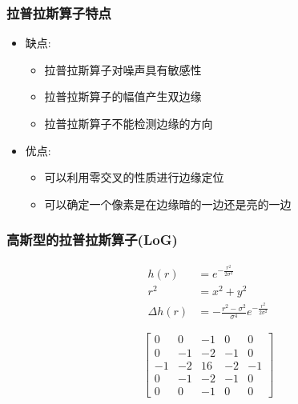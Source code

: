 \documentclass{beamer}
\begin{document}
\begin{frame}
\frametitle{拉普拉斯算子特点}
\label{sec-2-13}

\begin{itemize}
\item 缺点:
\begin{itemize}
\item 拉普拉斯算子对噪声具有敏感性
\item 拉普拉斯算子的幅值产生双边缘
\item 拉普拉斯算子不能检测边缘的方向
\end{itemize}
\item 优点:
\begin{itemize}
\item 可以利用零交叉的性质进行边缘定位
\item 可以确定一个像素是在边缘暗的一边还是亮的一边
\end{itemize}
\end{itemize}
\end{frame}
\begin{frame}
\frametitle{高斯型的拉普拉斯算子(LoG)}
\label{sec-2-14}

\begin{align*}
h(r) &= e^{-\frac{r^2}{2\sigma^2}} \\
r^2 &= x^2+y^2\\
\Delta h(r) &=-\frac{r^2-\sigma^2}{\sigma^4}e^{-\frac{r^2}{2\sigma^2}}
\end{align*}

\[ \begin{bmatrix}
     0 &  0 & -1 &  0 &  0 \\
     0 & -1 & -2 & -1 &  0 \\
    -1 & -2 & 16 & -2 & -1 \\
     0 & -1 & -2 & -1 &  0 \\
     0 &  0 & -1 &  0 &  0 \end{bmatrix}\]
\end{frame}
\end{document}
